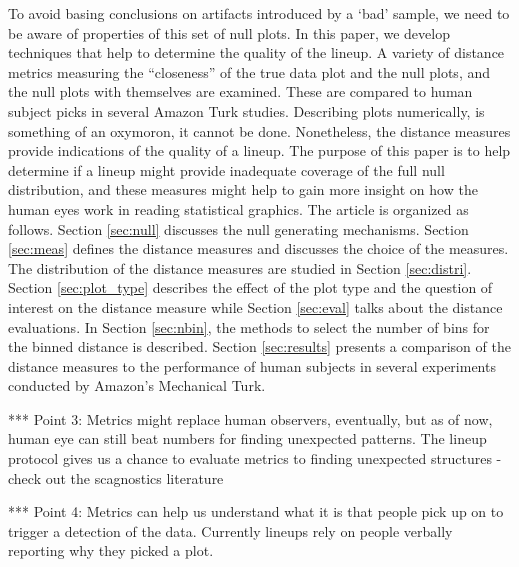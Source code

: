 \documentclass[12]{article}
\begin{document}
To avoid basing conclusions on artifacts introduced by a `bad' sample, we need to be aware of properties of this set of null plots. In this paper, we develop techniques that help to determine the quality of the lineup. A variety of distance metrics measuring the ``closeness'' of the true data plot and the null plots, and the null plots with themselves are examined. These are compared to human subject picks in several Amazon Turk studies.  Describing plots numerically, is something  of an oxymoron, it cannot be done. Nonetheless, the distance measures provide indications of the quality of a lineup. The purpose of this paper is to help determine if a lineup might provide inadequate coverage of the full null distribution, and these measures might help to gain more insight on how the human eyes work in reading statistical graphics. The article is organized as follows. Section \ref{sec:null} discusses the null generating mechanisms. Section \ref{sec:meas} defines the distance measures and discusses the choice of the measures. The distribution of the distance measures are studied in Section \ref{sec:distri}. Section \ref{sec:plot_type} describes the effect of the plot type and the question of interest on the distance measure while Section \ref{sec:eval} talks about the distance evaluations. In Section \ref{sec:nbin}, the methods to select the number of bins for the binned distance is described. Section \ref{sec:results} presents a comparison of the distance measures to the performance of human subjects in several experiments conducted by Amazon's Mechanical Turk.

***  Point 3: Metrics might replace human observers, eventually, but as of now, human eye can still beat numbers for finding unexpected patterns. The lineup protocol gives us a chance to evaluate metrics to finding unexpected structures - check out the scagnostics literature

*** Point 4: Metrics can help us understand what it is that people pick up on to trigger a detection of the data. Currently lineups rely on people verbally reporting why they picked a plot. 


\end{document}
